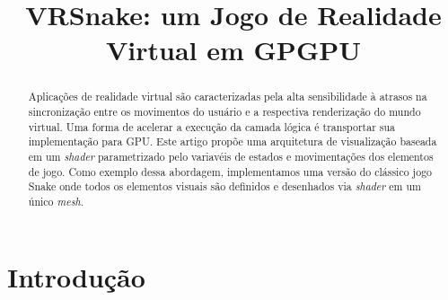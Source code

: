 \documentclass[conference]{IEEEtran}
\begin{document}
\title{VRSnake: um Jogo de Realidade Virtual em GPGPU}






\maketitle

\begin{abstract}
Aplicações de realidade virtual são caracterizadas pela alta sensibilidade à atrasos na sincronização entre os movimentos do usuário e a respectiva renderização do mundo virtual. Uma forma de acelerar a execução da camada lógica é transportar sua implementação para GPU.  Este artigo propõe uma arquitetura de visualização baseada em um \textit{shader} parametrizado pelo variavéis de estados e movimentações dos elementos de jogo. Como exemplo dessa abordagem, implementamos uma versão do clássico jogo Snake onde todos os elementos visuais são definidos e desenhados via \textit{shader} em um único \textit{mesh}.
\end{abstract}


\IEEEpeerreviewmaketitle

\section{Introdução} \label{sec:introduction}
\end{document}
